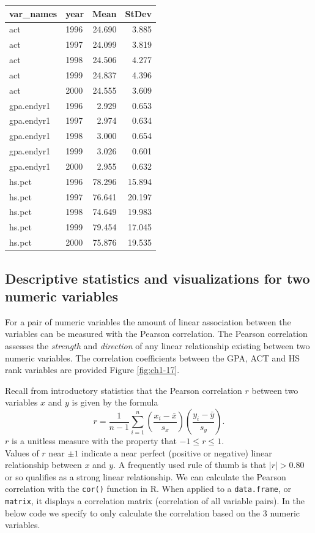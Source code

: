 \documentclass[
]{book}
\begin{document}
\begin{table}
\centering
\begin{tabular}{l|l|r|r}
\hline
var\_names & year & Mean & StDev\\
\hline
act & 1996 & 24.690 & 3.885\\
\hline
act & 1997 & 24.099 & 3.819\\
\hline
act & 1998 & 24.506 & 4.277\\
\hline
act & 1999 & 24.837 & 4.396\\
\hline
act & 2000 & 24.555 & 3.609\\
\hline
gpa.endyr1 & 1996 & 2.929 & 0.653\\
\hline
gpa.endyr1 & 1997 & 2.974 & 0.634\\
\hline
gpa.endyr1 & 1998 & 3.000 & 0.654\\
\hline
gpa.endyr1 & 1999 & 3.026 & 0.601\\
\hline
gpa.endyr1 & 2000 & 2.955 & 0.632\\
\hline
hs.pct & 1996 & 78.296 & 15.894\\
\hline
hs.pct & 1997 & 76.641 & 20.197\\
\hline
hs.pct & 1998 & 74.649 & 19.983\\
\hline
hs.pct & 1999 & 79.454 & 17.045\\
\hline
hs.pct & 2000 & 75.876 & 19.535\\
\hline
\end{tabular}
\end{table}

\hypertarget{descriptive-statistics-and-visualizations-for-two-numeric-variables}{%
\subsection{Descriptive statistics and visualizations for two numeric variables}\label{descriptive-statistics-and-visualizations-for-two-numeric-variables}}

For a pair of numeric variables the amount of linear association between the variables can be measured with the Pearson correlation.
The Pearson correlation assesses the \emph{strength} and \emph{direction} of any linear relationship existing between two numeric variables.
The correlation coefficients between the GPA, ACT and HS rank variables are provided Figure \ref{fig:ch1-17}.

Recall from introductory statistics that the Pearson correlation \(r\) between two variables \(x\) and \(y\) is given by the formula
\[r = \frac{1}{n-1}\sum_{i=1}^n\left(\frac{x_i - \bar{x}}{s_x}\right)\left(\frac{y_i - \bar{y}}{s_y}\right).\]
\(r\) is a unitless measure with the property that \(-1 \leq r \leq 1\).\\
Values of \(r\) near \(\pm 1\) indicate a near perfect (positive or negative) linear relationship between \(x\) and \(y\).
A frequently used rule of thumb is that \(|r| > 0.80\) or so qualifies as a strong linear relationship.
We can calculate the Pearson correlation with the \texttt{cor()} function in R.
When applied to a \texttt{data.frame}, or \texttt{matrix}, it displays a correlation matrix (correlation of all variable pairs).
In the below code we specify to only calculate the correlation based on the 3 numeric variables.
\end{document}
